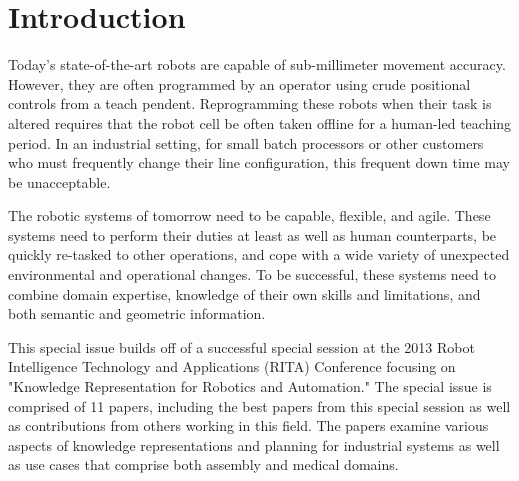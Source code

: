\section{Introduction}
Today's state-of-the-art robots are capable of sub-millimeter movement accuracy. 
However, they are often programmed by an operator using crude positional controls 
from a teach pendent. Reprogramming these robots when their task is altered requires 
that the robot cell be often taken offline for a human-led teaching period. In an 
industrial setting, for small batch processors or other customers who must 
frequently change their line configuration, this frequent down time may be unacceptable. 

The robotic systems of tomorrow need to be capable, flexible, and agile. These 
systems need to perform their duties at least as well as human counterparts, be 
quickly re-tasked to other operations, and cope with a wide variety of unexpected 
environmental and operational changes. To be successful, these systems need to combine 
domain expertise, knowledge of their own skills and limitations, and both semantic and 
geometric information.

This special issue builds off of a successful special session at the 2013 Robot Intelligence Technology and Applications (RITA) Conference focusing on "Knowledge Representation for Robotics and Automation." The special issue is comprised of 11 papers, including the best papers from this special session as well as contributions from others working in this field. The papers examine various aspects of knowledge representations and planning for industrial systems as well as use cases that comprise  both assembly and medical domains.
